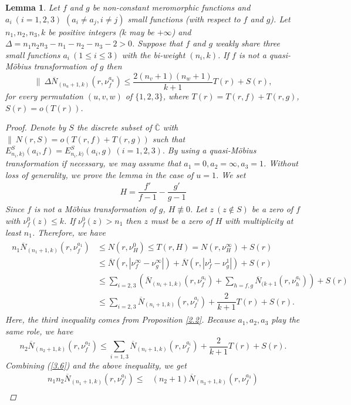\documentclass[12pt,leqno]{amsart}
\newtheorem{lemma}[equation]{Lemma}
\newcommand{\C}{{\mathbb{C}}}
\numberwithin{equation}{section}
\begin{document}
\begin{lemma}\label{2.6}
Let $f$ and $g$ be non-constant meromorphic functions and $a_i\ (i=1,2,3)$ $ (a_i\ne a_j, i\ne j)$ small functions (with respect to $f$ and $g$). Let $n_1,n_2,n_3,k$ be positive integers ($k$ may be $+\infty$) and $\Delta=n_1n_2n_3-n_1-n_2-n_3-2>0$. Suppose that $f$ and $g$ weakly share three small functions $a_i\ (1\le i\le 3)$ with the bi-weight $(n_i,k)$. If $f$ is not a quasi-M\"{o}bius transformation of $g$ then
$$\|\ \Delta\overline N_{(n_u+1,k)}(r,\nu^{a_u}_f)\le \frac{2(n_v+1)(n_w+1)}{k+1}T(r)+S(r),$$
for every permutation $(u,v,w)$ of $\{1,2,3\}$, where $T(r)=T(r,f)+T(r,g)$, $S(r)=o(T(r))$.
\begin{proof}
Denote by $S$ the discrete subset of $\overline\C$ with $\|\ N(r,S)=o(T(r,f)+T(r,g))$ such that $E^S_{n_i,k)}(a_i,f)=E^S_{n_i,k)}(a_i,g)\ (i=1,2,3).$ By using a quasi-M\"{o}bius transformation if necessary, we may assume that $a_1=0,a_2=\infty,a_3=1$. Without loss of generality, we prove the lemma in the case of $u=1$. We set
\begin{align*}
H=\dfrac{f'}{f-1}-\dfrac{g'}{g-1}
\end{align*}
Since $f$ is not a M\"{o}bius transformation of $g$, $H\not\equiv 0$. Let $z\ (z\not\in S)$ be a zero of $f$ with $\nu^0_f(z)\le k$. If $\nu^0_f(z)> n_1$ then $z$ must be a zero of $H$ with multiplicity at least $n_1$. Therefore, we have
\begin{align}\label{3.6}
\begin{split}
n_1\overline N_{(n_1+1,k)}(r,\nu^{a_1}_f)&\le N(r,\nu^0_{H})\le T(r,H)=N(r,\nu^{\infty}_{H})+S(r)\\
&\leq \overline N(r,|\nu^{\infty}_f-\nu^{\infty}_g |)+\overline N(r,|\nu^{1}_f-\nu^{1}_g |)+S(r)\\
&\leq \sum_{i=2,3}(\overline N_{(n_i+1,k)}(r,\nu^{a_i}_{f})+\sum_{h=f,g}\overline N_{(k+1}(r,\nu^{a_i}_{h}))+S(r)\\
&\leq \sum_{i=2,3}\overline N_{(n_i+1,k)}(r,\nu^{a_i}_{f})+\dfrac{2}{k+1}T(r)+S(r).
\end{split}
\end{align}
Here, the third inequality comes from Proposition \ref{2.2}. Because $a_1,a_2,a_3$ play the same role, we have
$$n_2\overline N_{(n_2+1,k)}(r,\nu^{a_2}_f)\leq\sum_{i=1,3} \overline N_{(n_i+1,k)}(r,\nu^{a_i}_{f})+\dfrac{2}{k+1}T(r)+S(r).$$
Combining (\ref{3.6}) and the above inequality, we get
\begin{align*}
n_1n_2\overline N_{(n_1+1,k)}(r,\nu^{a_1}_f)\le&(n_2+1)\overline N_{(n_3+1,k)}(r,\nu^{a_3}_{f})\\

\end{align*}
\end{proof}
\end{lemma}
\end{document}
